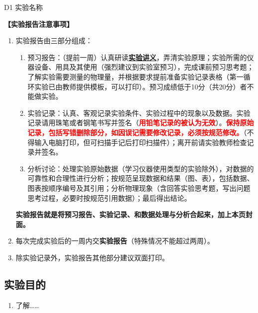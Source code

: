 \documentclass[dvipsnames, svgnames,a4paper,11pt]{article}
\begin{document}
\scoresTable{}{}{}{}{}{}{}{}


\begin{center}
	\LARGE D1 \quad 实验名称
\end{center}

\textbf{【实验报告注意事项】}
\begin{enumerate}
	\item 实验报告由三部分组成：
	\begin{enumerate}
		\item 预习报告：（提前一周）认真研读\underline{\textbf{实验讲义}}，弄清实验原理；实验所需的仪器设备、用具及其使用（强烈建议到实验室预习），完成课前预习思考题；了解实验需要测量的物理量，并根据要求提前准备实验记录表格（第一循环实验已由教师提供模板，可以打印）。预习成绩低于10分（共20分）者不能做实验。
	    \item 实验记录：认真、客观记录实验条件、实验过程中的现象以及数据。实验记录请用珠笔或者钢笔书写并签名（\textcolor{red}{\textbf{用铅笔记录的被认为无效}}）。\textcolor{red}{\textbf{保持原始记录，包括写错删除部分，如因误记需要修改记录，必须按规范修改。}}（不得输入电脑打印，但可扫描手记后打印扫描件）；离开前请实验教师检查记录并签名。
	    \item 分析讨论：处理实验原始数据（学习仪器使用类型的实验除外），对数据的可靠性和合理性进行分析；按规范呈现数据和结果（图、表），包括数据、图表按顺序编号及其引用；分析物理现象（含回答实验思考题，写出问题思考过程，必要时按规范引用数据）；最后得出结论。
	\end{enumerate}
	\textbf{实验报告就是将预习报告、实验记录、和数据处理与分析合起来，加上本页封面。}
	\item 每次完成实验后的一周内交\textbf{实验报告}（特殊情况不能超过两周）。
	\item 除实验记录外，实验报告其他部分建议双面打印。
\end{enumerate}


\clearpage
\tableofcontents
\clearpage

\setcounter{section}{0}
	
\subsection{实验目的}
\begin{enumerate}
	\item 了解……
\end{enumerate}
\end{document}
